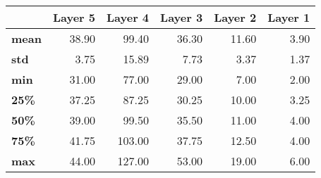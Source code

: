 \begin{tabular}{lrrrrr}
\toprule
{} &  Layer 5 &  Layer 4 &  Layer 3 &  Layer 2 &  Layer 1 \\
\midrule
\textbf{mean} &    38.90 &    99.40 &    36.30 &    11.60 &     3.90 \\
\textbf{std } &     3.75 &    15.89 &     7.73 &     3.37 &     1.37 \\
\textbf{min } &    31.00 &    77.00 &    29.00 &     7.00 &     2.00 \\
\textbf{25\% } &    37.25 &    87.25 &    30.25 &    10.00 &     3.25 \\
\textbf{50\% } &    39.00 &    99.50 &    35.50 &    11.00 &     4.00 \\
\textbf{75\% } &    41.75 &   103.00 &    37.75 &    12.50 &     4.00 \\
\textbf{max } &    44.00 &   127.00 &    53.00 &    19.00 &     6.00 \\
\bottomrule
\end{tabular}

